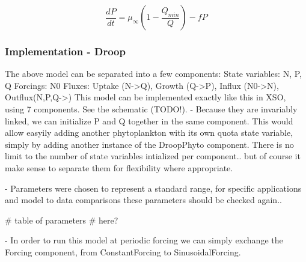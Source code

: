 \begin{equation}
    \frac{d P}{d t} =
    \mu_\infty (1 - \frac{Q_{min}}{Q})
    - f P
\end{equation}

\subsubsection{Implementation - Droop}




The above model can be separated into a few components:
State variables: N, P, Q
Forcings: N0
Fluxes: Uptake (N->Q), Growth (Q->P), Influx (N0->N), Outflux(N,P,Q->)
This model can be implemented exactly like this in XSO, using 7 components. See the schematic (TODO!).
- Because they are invariably linked, we can initialize P and Q together in the same component. This would allow easyily adding another phytoplankton with its own quota state variable, simply by adding another instance of the DroopPhyto component. There is no limit to the number of state variables intialized per component.. but of course it make sense to separate them for flexibility where appropriate.

- Parameters were chosen to represent a standard range, for specific applications and model to data comparisons these parameters should be checked again..

# table of parameters # here?

- In order to run this model at periodic forcing we can simply exchange the Forcing component, from ConstantForcing to SinusoidalForcing.
























